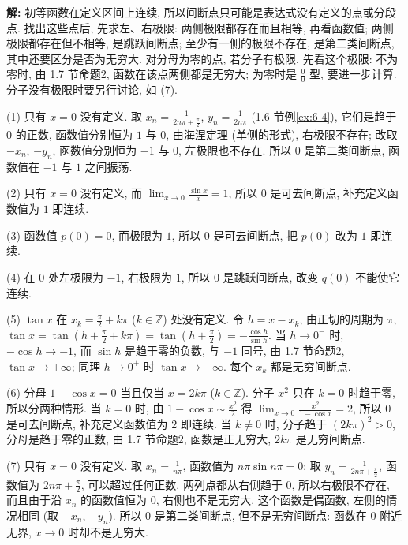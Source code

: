 \documentclass[UTF8,openany]{ctexbook}
\theoremstyle{chinesetextbook}
\newenvironment{cnsolution}{\par\indent\textbf{解:} \ignorespaces}{\par}
\begin{document}
\begin{cnsolution}
初等函数在定义区间上连续, 所以间断点只可能是表达式没有定义的点或分段点. 找出这些点后, 先求左、右极限: 两侧极限都存在而且相等, 再看函数值; 两侧极限都存在但不相等, 是跳跃间断点; 至少有一侧的极限不存在, 是第二类间断点, 其中还要区分是否为无穷大. 对分母为零的点, 若分子有极限, 先看这个极限: 不为零时, 由 1.7 节命题2, 函数在该点两侧都是无穷大; 为零时是 $\displaystyle\frac00$ 型, 要进一步计算. 分子没有极限时要另行讨论, 如 (7).

(1) 只有 $x=0$ 没有定义. 取 $\displaystyle x_n=\frac1{2n\pi+\frac\pi2}$, $\displaystyle y_n=\frac1{2n\pi}$ (1.6 节例\ref{ex:6-4}), 它们是趋于 $0$ 的正数, 函数值分别恒为 $1$ 与 $0$, 由海涅定理 (单侧的形式), 右极限不存在; 改取 $-x_n$, $-y_n$, 函数值分别恒为 $-1$ 与 $0$, 左极限也不存在. 所以 $0$ 是第二类间断点, 函数值在 $-1$ 与 $1$ 之间振荡.

(2) 只有 $x=0$ 没有定义, 而 $\displaystyle\lim_{x\to0}\frac{\sin x}x=1$, 所以 $0$ 是可去间断点, 补充定义函数值为 $1$ 即连续.

(3) 函数值 $p(0)=0$, 而极限为 $1$, 所以 $0$ 是可去间断点, 把 $p(0)$ 改为 $1$ 即连续.

(4) 在 $0$ 处左极限为 $-1$, 右极限为 $1$, 所以 $0$ 是跳跃间断点, 改变 $q(0)$ 不能使它连续.

(5) $\tan x$ 在 $\displaystyle x_k=\frac\pi2+k\pi$ ($k\in\mathbb Z$) 处没有定义. 令 $h=x-x_k$, 由正切的周期为 $\pi$, $\displaystyle\tan x=\tan\left(h+\frac\pi2+k\pi\right)=\tan\left(h+\frac\pi2\right)=-\frac{\cos h}{\sin h}$. 当 $h\to0^-$ 时, $-\cos h\to-1$, 而 $\sin h$ 是趋于零的负数, 与 $-1$ 同号, 由 1.7 节命题2, $\tan x\to+\infty$; 同理 $h\to0^+$ 时 $\tan x\to-\infty$. 每个 $x_k$ 都是无穷间断点.

(6) 分母 $1-\cos x=0$ 当且仅当 $x=2k\pi$ ($k\in\mathbb Z$). 分子 $x^2$ 只在 $k=0$ 时趋于零, 所以分两种情形. 当 $k=0$ 时, 由 $\displaystyle1-\cos x\sim\frac{x^2}2$ 得 $\displaystyle\lim_{x\to0}\frac{x^2}{1-\cos x}=2$, 所以 $0$ 是可去间断点, 补充定义函数值为 $2$ 即连续. 当 $k\ne0$ 时, 分子趋于 $(2k\pi)^2>0$, 分母是趋于零的正数, 由 1.7 节命题2, 函数是正无穷大, $2k\pi$ 是无穷间断点.

(7) 只有 $x=0$ 没有定义. 取 $\displaystyle x_n=\frac1{n\pi}$, 函数值为 $n\pi\sin n\pi=0$; 取 $\displaystyle y_n=\frac1{2n\pi+\frac\pi2}$, 函数值为 $\displaystyle2n\pi+\frac\pi2$, 可以超过任何正数. 两列点都从右侧趋于 $0$, 所以右极限不存在, 而且由于沿 $x_n$ 的函数值恒为 $0$, 右侧也不是无穷大. 这个函数是偶函数, 左侧的情况相同 (取 $-x_n$, $-y_n$). 所以 $0$ 是第二类间断点, 但不是无穷间断点: 函数在 $0$ 附近无界, $x\to0$ 时却不是无穷大.
\end{cnsolution}
\end{document}
